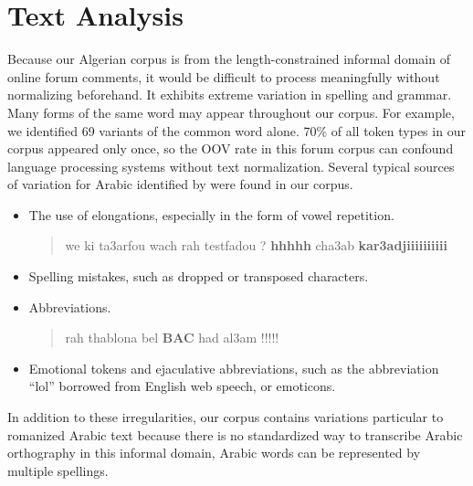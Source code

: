 \documentclass[10pt, a4paper]{article}
\begin{document}
\section{Text Analysis}
Because our Algerian corpus is from the length-constrained informal
domain of online forum comments, it would be difficult to process
meaningfully without normalizing beforehand. It exhibits extreme
variation in spelling and grammar. Many forms of the same word may
appear throughout our corpus. For example, we identified 69 variants
of the common word  alone. 70\% of all token types in
our corpus appeared only once, so the OOV rate in this forum corpus
can confound language processing systems without text normalization.
 Several typical sources of variation for Arabic identified by
\cite{Darwish:2012:LPA:2396761.2398658} were found in our corpus.
\begin{itemize}
\item The use of elongations, especially in the form of vowel repetition.
\begin{quote}
we ki ta3arfou wach rah testfadou ? {\bf hhhhh} cha3ab {\bf kar3adjiiiiiiiiii}
\end{quote}

\item Spelling mistakes, such as dropped or transposed characters.

\item Abbreviations.

\begin{quote}
rah thablona bel {\bf BAC} had al3am !!!!!
\end{quote}

\item Emotional tokens and ejaculative abbreviations, such as the abbreviation ``lol'' borrowed from
  English web speech, or emoticons.
\end{itemize}

In addition to these irregularities, our corpus contains variations
particular to romanized Arabic text because there is no standardized way
to transcribe Arabic orthography in this informal domain, Arabic words can be represented by multiple spellings. 
\end{document}
